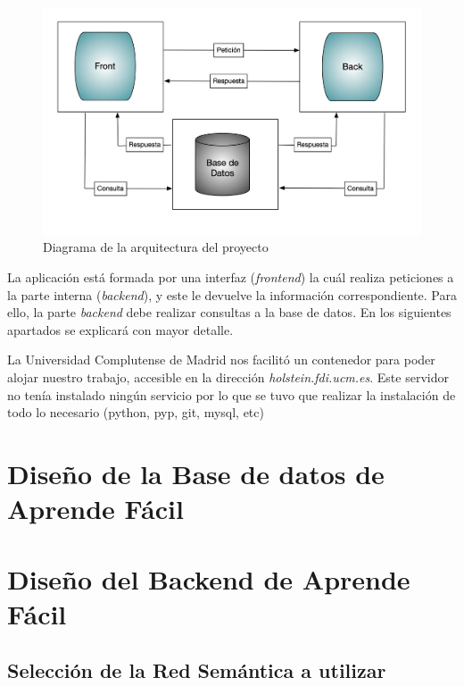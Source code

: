 \begin{figure}[!h]
	\includegraphics[width=.9\textwidth]{Imagenes/Bitmap/Capitulo4/DiagramaArquitectura.png}
	\caption{Diagrama de la arquitectura del proyecto}
	\label{fig:diagrama_arquitectura}
\end{figure}

La aplicación está formada por una interfaz (\textit{frontend}) la cuál realiza peticiones a la parte interna (\textit{backend}), y este le devuelve la información correspondiente. Para ello, la parte \textit{backend} debe realizar consultas a la base de datos. En los siguientes apartados se explicará con mayor detalle.

La Universidad Complutense de Madrid nos facilitó un contenedor para poder alojar nuestro trabajo, accesible en la dirección \textit{holstein.fdi.ucm.es}. Este servidor no tenía instalado ningún servicio por lo que se tuvo que realizar la instalación de todo lo necesario (python, pyp, git, mysql, etc) 
\section{Diseño de la Base de datos de Aprende Fácil}

\section{Diseño del Backend de Aprende Fácil}

\subsection{Selección de la Red Semántica a utilizar}
\label{cap:subsec:redsemanticautilizada}

